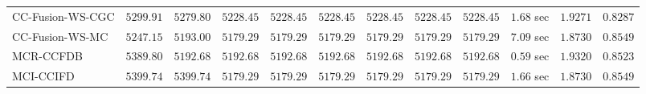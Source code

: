 \begin{table}[H]
\begin{tabular}{lrrrrrrrrrrr}
    CC-Fusion-WS-CGC & $      5299.91$ & $      5279.80$ & $      5228.45$ & $      5228.45$ & $      5228.45$ & $      5228.45$ & $      5228.45$ & $      5228.45$ & $         1.68$ sec    & $       1.9271$  & $       0.8287$ \\ 
     CC-Fusion-WS-MC & $      5247.15$ & $      5193.00$ & $      5179.29$ & $      5179.29$ & $      5179.29$ & $      5179.29$ & $      5179.29$ & $      5179.29$ & $         7.09$ sec    & $       1.8730$  & $       0.8549$ \\ 
\cmidrule{1-1} 
           MCR-CCFDB & $      5389.80$ & $      5192.68$ & $      5192.68$ & $      5192.68$ & $      5192.68$ & $      5192.68$ & $      5192.68$ & $      5192.68$ & $         0.59$ sec    & $       1.9320$  & $       0.8523$ \\ 
\cmidrule{1-1} 
           MCI-CCIFD & $      5399.74$ & $      5399.74$ & $      5179.29$ & $      5179.29$ & $      5179.29$ & $      5179.29$ & $      5179.29$ & $      5179.29$ & $         1.66$ sec    & $       1.8730$  & $       0.8549$ \\ 
\bottomrule
\end{tabular}
\end{table}

